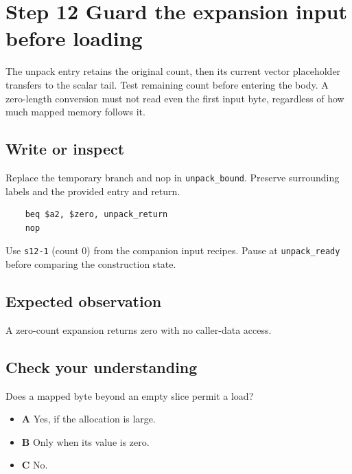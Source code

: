 \section{Step 12 Guard the expansion input before loading}\label{rgb-s12}

The unpack entry retains the original count, then its current vector placeholder transfers to the scalar tail. Test remaining count before entering the body. A zero-length conversion must not read even the first input byte, regardless of how much mapped memory follows it.

\subsection{Write or inspect}
Replace the temporary branch and nop in \texttt{unpack\_bound}. Preserve surrounding labels and the provided entry and return.

\begin{verbatim}
    beq $a2, $zero, unpack_return
    nop
\end{verbatim}
Use \texttt{s12-1} (count 0) from the companion input recipes. Pause at \texttt{unpack\_ready} before comparing the construction state.

\subsection{Expected observation}
A zero-count expansion returns zero with no caller-data access.

\subsection{Check your understanding}
Does a mapped byte beyond an empty slice permit a load?

\begin{itemize}
  \item \textbf{A} Yes, if the allocation is large.
  \item \textbf{B} Only when its value is zero.
  \item \textbf{C} No.
\end{itemize}
